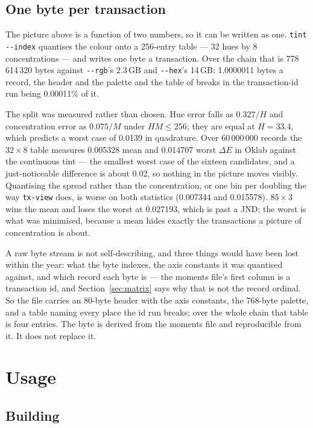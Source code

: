 \documentclass[11pt,a4paper]{article}
\newcommand{\bin}[1]{\texttt{#1}}
\newcommand{\flag}[1]{\texttt{-{}-#1}}
\begin{document}
\subsection{One byte per transaction}
\label{sec:byte}

The picture above is a function of two numbers, so it can be written as one.
\bin{tint} \flag{index} quantises the colour onto a 256-entry table --- 32 hues
by 8 concentrations --- and writes one byte a transaction. Over the chain that is
778\,614\,320 bytes against \flag{rgb}'s 2.3\,GB and \flag{hex}'s 14\,GB:
1.0000011 bytes a record, the header and the palette and the table of breaks in
the transaction-id run being 0.00011\% of it.

The split was measured rather than chosen. Hue error falls as $0.327/H$ and
concentration error as $0.075/M$ under $HM \le 256$; they are equal at
$H = 33.4$, which predicts a worst case of 0.0139 in quadrature. Over
60\,000\,000 records the $32\times8$ table measures 0.005328 mean and 0.014707
worst $\Delta E$ in Oklab against the continuous tint --- the smallest worst case
of the sixteen candidates, and a just-noticeable difference is about 0.02, so
nothing in the picture moves visibly. Quantising the spread rather than the
concentration, or one bin per doubling the way \bin{tx-view} does, is worse on
both statistics (0.007344 and 0.015578). $85\times3$ wins the mean and loses the
worst at 0.027193, which is past a JND; the worst is what was minimised, because
a mean hides exactly the transactions a picture of concentration is about.

A raw byte stream is not self-describing, and three things would have been lost
within the year: what the byte indexes, the axis constants it was quantised
against, and which record each byte is --- the moments file's first column is a
transaction id, and Section~\ref{sec:matrix} says why that is not the record
ordinal. So the file carries an 80-byte header with the axis constants, the
768-byte palette, and a table naming every place the id run breaks; over the
whole chain that table is four entries. The byte is derived from the moments
file and reproducible from it. It does not replace it.

\section{Usage}

\subsection{Building}
\end{document}
